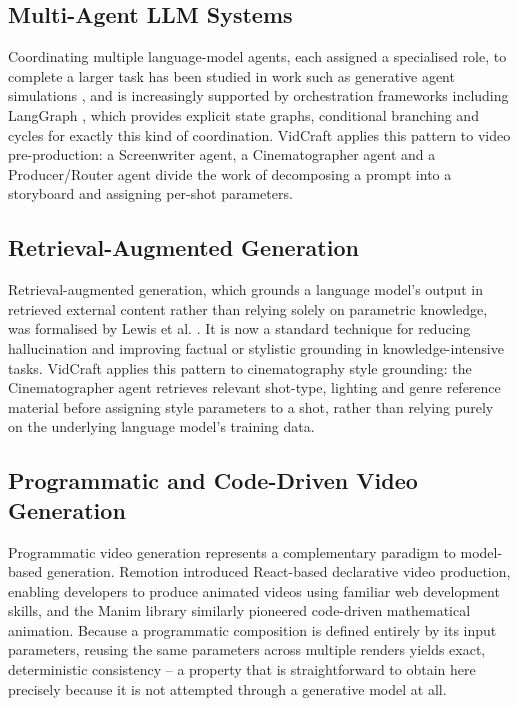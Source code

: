 \documentclass[11pt,a4paper]{article}
\begin{document}
\subsection{Multi-Agent LLM Systems}
Coordinating multiple language-model agents, each assigned a specialised role, to complete a larger task has been studied in work such as generative agent simulations \cite{genagents}, and is increasingly supported by orchestration frameworks including LangGraph \cite{langgraph}, which provides explicit state graphs, conditional branching and cycles for exactly this kind of coordination. VidCraft applies this pattern to video pre-production: a Screenwriter agent, a Cinematographer agent and a Producer/Router agent divide the work of decomposing a prompt into a storyboard and assigning per-shot parameters.

\subsection{Retrieval-Augmented Generation}
Retrieval-augmented generation, which grounds a language model's output in retrieved external content rather than relying solely on parametric knowledge, was formalised by Lewis et al. \cite{rag}. It is now a standard technique for reducing hallucination and improving factual or stylistic grounding in knowledge-intensive tasks. VidCraft applies this pattern to cinematography style grounding: the Cinematographer agent retrieves relevant shot-type, lighting and genre reference material before assigning style parameters to a shot, rather than relying purely on the underlying language model's training data.

\subsection{Programmatic and Code-Driven Video Generation}
Programmatic video generation represents a complementary paradigm to model-based generation. Remotion \cite{remotion} introduced React-based declarative video production, enabling developers to produce animated videos using familiar web development skills, and the Manim library \cite{manim} similarly pioneered code-driven mathematical animation. Because a programmatic composition is defined entirely by its input parameters, reusing the same parameters across multiple renders yields exact, deterministic consistency -- a property that is straightforward to obtain here precisely because it is not attempted through a generative model at all.
\end{document}

